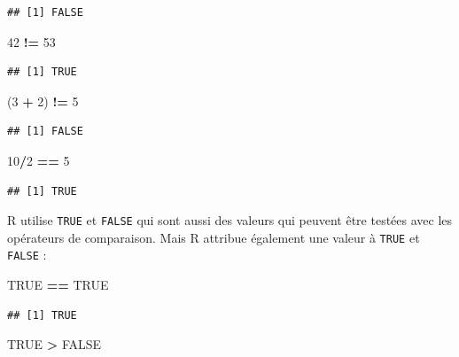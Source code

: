 \documentclass[
]{book}
\newenvironment{Shaded}{\begin{snugshade}}{\end{snugshade}}
\newcommand{\DecValTok}[1]{\textcolor[rgb]{0.00,0.00,0.81}{#1}}
\newcommand{\NormalTok}[1]{#1}
\newcommand{\OperatorTok}[1]{\textcolor[rgb]{0.81,0.36,0.00}{\textbf{#1}}}
\newcommand{\OtherTok}[1]{\textcolor[rgb]{0.56,0.35,0.01}{#1}}
\newcommand{\StringTok}[1]{\textcolor[rgb]{0.31,0.60,0.02}{#1}}
\begin{document}
\begin{verbatim}
## [1] FALSE
\end{verbatim}

\begin{Shaded}
\begin{Highlighting}[]
\DecValTok{42} \OperatorTok{!=}\StringTok{ }\DecValTok{53}
\end{Highlighting}
\end{Shaded}

\begin{verbatim}
## [1] TRUE
\end{verbatim}

\begin{Shaded}
\begin{Highlighting}[]
\NormalTok{(}\DecValTok{3} \OperatorTok{+}\StringTok{ }\DecValTok{2}\NormalTok{) }\OperatorTok{!=}\StringTok{ }\DecValTok{5}
\end{Highlighting}
\end{Shaded}

\begin{verbatim}
## [1] FALSE
\end{verbatim}

\begin{Shaded}
\begin{Highlighting}[]
\DecValTok{10}\OperatorTok{/}\DecValTok{2} \OperatorTok{==}\StringTok{ }\DecValTok{5}
\end{Highlighting}
\end{Shaded}

\begin{verbatim}
## [1] TRUE
\end{verbatim}

R utilise \texttt{TRUE} et \texttt{FALSE} qui sont aussi des valeurs qui peuvent être testées avec les opérateurs de comparaison. Mais R attribue également une valeur à \texttt{TRUE} et \texttt{FALSE} :

\begin{Shaded}
\begin{Highlighting}[]
\OtherTok{TRUE} \OperatorTok{==}\StringTok{ }\OtherTok{TRUE}
\end{Highlighting}
\end{Shaded}

\begin{verbatim}
## [1] TRUE
\end{verbatim}

\begin{Shaded}
\begin{Highlighting}[]
\OtherTok{TRUE} \OperatorTok{>}\StringTok{ }\OtherTok{FALSE}
\end{Highlighting}
\end{Shaded}
\end{document}
